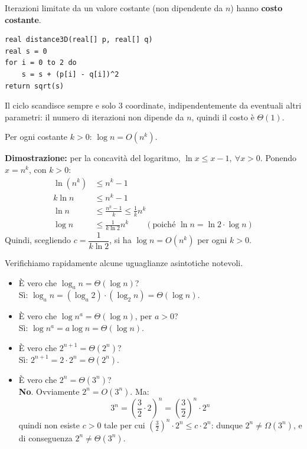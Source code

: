 \documentclass[12pt, a4paper]{article}
\begin{document}
\begin{tcolorbox}[colback=lightergray!5, colframe=tocsubsec, title=\textbf{Regola pratica}]
\label{oss:costo-costante}
Iterazioni limitate da un valore costante (non dipendente da $n$) hanno \textbf{costo costante}.
\end{tcolorbox}

\begin{verbatim}
real distance3D(real[] p, real[] q)
real s = 0
for i = 0 to 2 do
    s = s + (p[i] - q[i])^2
return sqrt(s)
\end{verbatim}
Il ciclo scandisce sempre e solo 3 coordinate, indipendentemente da eventuali altri parametri: il numero di iterazioni non dipende da $n$, quindi il costo è $\Theta(1)$.

\begin{tcolorbox}[colback=lightergray!10, colframe=tocsec, title=\textbf{Proprietà: Logaritmi vs Funzioni Polinomiali}]
\label{prop:log-polinomiale}
Per ogni costante $k > 0$: $\log n = O(n^k)$.
\end{tcolorbox}

\textbf{Dimostrazione:} per la concavità del logaritmo, $\ln x \le x - 1,\ \forall x>0$. Ponendo $x = n^k$, con $k>0$:
\begin{align*}
\ln(n^k) &\le n^k - 1 \\
k\ln n &\le n^k - 1 \\
\ln n &\le \frac{n^k-1}{k} \le \frac{1}{k}n^k \\
\log n &\le \frac{1}{k\ln 2}n^k \qquad (\text{poiché } \ln n = \ln 2 \cdot \log n)
\end{align*}
Quindi, scegliendo $c = \dfrac{1}{k\ln 2}$, si ha $\log n = O(n^k)$ per ogni $k>0$.

\begin{tcolorbox}[colback=lightergray!10, colframe=tocsec, title=\textbf{Prendiamo Confidenza}]
Verifichiamo rapidamente alcune uguaglianze asintotiche notevoli.
\begin{itemize}
    \item È vero che $\log_a n = \Theta(\log n)$? \\
    Sì: $\log_a n = (\log_a 2)\cdot(\log_2 n) = \Theta(\log n)$.
    \item È vero che $\log n^a = \Theta(\log n)$, per $a>0$? \\
    Sì: $\log n^a = a\log n = \Theta(\log n)$.
    \item È vero che $2^{n+1} = \Theta(2^n)$? \\
    Sì: $2^{n+1} = 2\cdot 2^n = \Theta(2^n)$.
    \item È vero che $2^n = \Theta(3^n)$? \\
    \textcolor{red!70!black}{\textbf{No}}. Ovviamente $2^n = O(3^n)$. Ma:
    $$3^n = \left(\frac{3}{2}\cdot 2\right)^n = \left(\frac{3}{2}\right)^n \cdot 2^n$$
    quindi non esiste $c>0$ tale per cui $\left(\frac{3}{2}\right)^n \cdot 2^n \le c\cdot 2^n$: dunque $2^n \ne \Omega(3^n)$, e di conseguenza $2^n \ne \Theta(3^n)$.
\end{itemize}
\end{tcolorbox}
\end{document}
